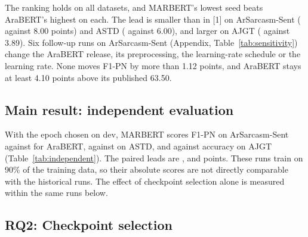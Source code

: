 The ranking holds on all \rsNRankHoldHist{} datasets, and MARBERT's lowest seed beats AraBERT's highest on
each. The lead is smaller than in [1] on ArSarcasm-Sent (\rsMarginHistArSarcHm{} against 8.00 points) and
ASTD (\rsMarginHistAstdHm{} against 6.00), and larger on AJGT (\rsMarginHistAjgtHm{} against 3.89). Six
follow-up runs on ArSarcasm-Sent (Appendix, Table~\ref{tab:sensitivity}) change the AraBERT release, its
preprocessing, the learning-rate schedule or the learning rate. None moves F1-PN by more than 1.12 points,
and AraBERT stays at least 4.10 points above its published 63.50.

\subsection{Main result: independent evaluation}
\label{sec:results-main}

\begin{table}[t]
\centering\footnotesize\setlength{\tabcolsep}{3pt}

\caption{\rsSyntheticBanner Main result: independent protocol (epoch chosen on dev with the published metric),
test scores as mean $\pm$ SD over seeds. Epochs = dev-selected epoch per seed.}
\label{tab:independent}
\end{table}

With the epoch chosen on dev, MARBERT scores \rsIndHmArSarcMarbert{} F1-PN on ArSarcasm-Sent against
\rsIndHmArSarcArabert{} for AraBERT, \rsIndHmAstdMarbert{} against \rsIndHmAstdArabert{} on ASTD, and
\rsIndHmAjgtMarbert{} against \rsIndHmAjgtArabert{} accuracy on AJGT (Table~\ref{tab:independent}). The
paired leads are \rsMarginIndArSarcHm{}, \rsMarginIndAstdHm{} and \rsMarginIndAjgtHm{} points. These runs
train on 90\% of the training data, so their absolute scores are not directly comparable with the
historical runs. The effect of checkpoint selection alone is measured within the same runs below.

\subsection{RQ2: Checkpoint selection}
\label{sec:results-rq2}

\begin{table}[t]
\centering\footnotesize\setlength{\tabcolsep}{5pt}

\caption{\rsSyntheticBanner Checkpoint diagnostic on the independent runs (published metric). Dev-sel.\ = test
score at the dev-selected epoch (as run); Dev macro-F1 = the same runs with the epoch chosen on dev macro-F1
(the proposal's rule); Best on test = best test epoch of the same runs; Optimism = Best $-$ Dev-sel.\ per run,
mean $\pm$ SD; Same epoch = runs whose dev-selected epoch is also the best test epoch.}
\label{tab:checkpoint}
\end{table}

